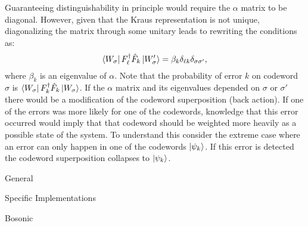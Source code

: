 Guaranteeing distinguishability in principle would require the $\alpha$ matrix to be diagonal. However, given that the Kraus representation is not unique, diagonalizing the matrix through some unitary leads to rewriting the conditions as:
\begin{equation}
    \bra{W_\sigma}  F_\ell^\dagger\hat F_k \ket{W_\sigma'}= \beta_k\delta_{\ell k}\delta_{\sigma\sigma'},
\end{equation}
where $\beta_k$ is an eigenvalue of $\alpha$. Note that the probability of error $k$ on codeword $\sigma$ is $\bra{W_\sigma}  F_k^\dagger\hat F_k \ket{W_\sigma}$. If the $\alpha$ matrix and its eigenvalues depended on $\sigma$ or $\sigma'$ there would be a modification of the codeword superposition (back action). If one of the errors was more likely for one of the codewords, knowledge that this error occurred would imply that that codeword should be weighted more heavily as a possible state of the system. To understand this consider the extreme case where an error can only happen in one of the codewords $\ket{\psi_k}$. If this error is detected the codeword superposition collapses to $\ket{\psi_k}$.




\clearpage

General \cite{Girvin2021} \cite{Andersen2020} \cite{Gottesman2009} \cite{Roffe2019} \cite{devitt}

Specific Implementations \cite{Krinner2021} \cite{Chen2021} \cite{cleland2022}

Bosonic \cite{campagne2020} \cite{Lau2016} \cite{Chuang1997} \cite{Terhal2020} \cite{Blais2020} \cite{Hu2019} \cite{Michael2016} \cite{Grimsmo2021} \cite{Cai2021} \cite{Brady2023} \cite{lachance2023}